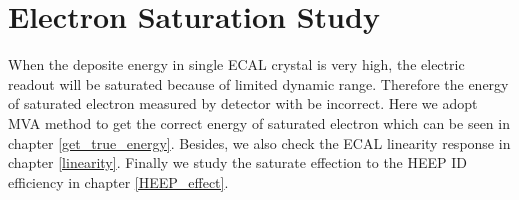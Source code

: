 \clearpage
\section{Electron Saturation Study}\label{app:Saturation}
When the deposite energy in single ECAL crystal is very high, the electric readout will be saturated because of limited dynamic range. Therefore the energy of saturated electron measured by detector with be incorrect. Here we adopt MVA method to get the correct energy of saturated electron which can be seen in chapter \ref{get_true_energy}. Besides, we also check the ECAL linearity response in chapter \ref{linearity}. Finally we study the saturate effection to the HEEP ID efficiency in chapter \ref{HEEP_effect}.


\clearpage

\clearpage

\clearpage

\clearpage

\clearpage
